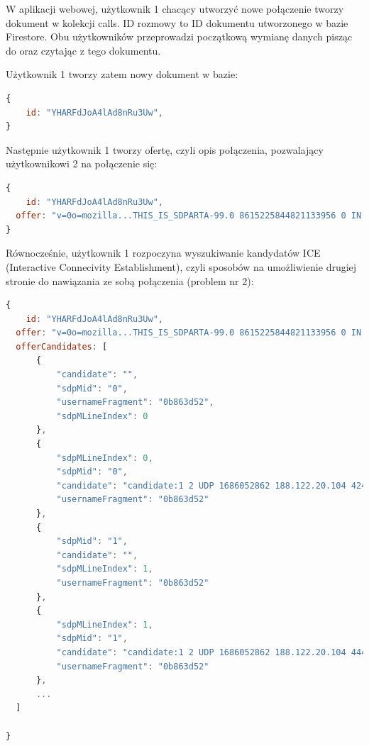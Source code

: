 W aplikacji webowej, użytkownik 1 chacący utworzyć nowe połączenie tworzy dokument w kolekcji calls. ID rozmowy to ID
dokumentu utworzonego w bazie Firestore. Obu użytkowników przeprowadzi początkową wymianę danych pisząc do oraz czytając
z tego dokumentu.

Użytkownik 1 tworzy zatem nowy dokument w bazie:

\begin{lstlisting}[language=Javascript,label=list:call-doc-1, caption=Dokument połączenia po utworzeniu przez użytkownika 1,
basicstyle=\footnotesize \ttfamily, showtabs=true, tabsize=4]
{
	id: "YHARFdJoA4lAd8nRu3Uw",
}
\end{lstlisting}

Następnie użytkownik 1 tworzy ofertę, czyli opis połączenia, pozwalający użytkownikowi 2 na połączenie się:

\begin{lstlisting}[language=Javascript,label=list:call-doc-2, caption=Dokument połączenia po dodaniu opisu sesji w protokole SDP,
basicstyle=\footnotesize \ttfamily, showtabs=true, tabsize=4]
{
	id: "YHARFdJoA4lAd8nRu3Uw",
  offer: "v=0o=mozilla...THIS_IS_SDPARTA-99.0 8615225844821133956 0 IN IP4 0.0.0.0s=-t=0 0a=fingerprint:sha-256 5F:A8:8A:A5:B8:1D:0C:39:21:93:FA:3A:B2:B7:B6:3F:EF:8A:5D:3C:6E:86:2E:A7:0A:D4:F0:E3:58:E0:E2:7B..."
}
\end{lstlisting}

Równocześnie, użytkownik 1 rozpoczyna wyszukiwanie kandydatów ICE (Interactive Connecivity Establishment), czyli
sposobów na umożliwienie drugiej stronie do nawiązania ze sobą połączenia (problem nr 2):

\begin{lstlisting}[language=Javascript,label=list:call-doc-3, caption=Dokument połączenia po dodaniu kandydatów ICE,
basicstyle=\footnotesize \ttfamily, showtabs=true, tabsize=4]
{
	id: "YHARFdJoA4lAd8nRu3Uw",
  offer: "v=0o=mozilla...THIS_IS_SDPARTA-99.0 8615225844821133956 0 IN IP4 0.0.0.0s=-t=0 0a=fingerprint:sha-256 5F:A8:8A:A5:B8:1D:0C:39:21:93:FA:3A:B2:B7:B6:3F:EF:8A:5D:3C:6E:86:2E:A7:0A:D4:F0:E3:58:E0:E2:7B...",
  offerCandidates: [
      {
          "candidate": "",
          "sdpMid": "0",
          "usernameFragment": "0b863d52",
          "sdpMLineIndex": 0
      },
      {
          "sdpMLineIndex": 0,
          "sdpMid": "0",
          "candidate": "candidate:1 2 UDP 1686052862 188.122.20.104 42436 typ srflx raddr 192.168.1.2 rport 42436",
          "usernameFragment": "0b863d52"
      },
      {
          "sdpMid": "1",
          "candidate": "",
          "sdpMLineIndex": 1,
          "usernameFragment": "0b863d52"
      },
      {
          "sdpMLineIndex": 1,
          "sdpMid": "1",
          "candidate": "candidate:1 2 UDP 1686052862 188.122.20.104 44466 typ srflx raddr 192.168.1.2 rport 44466",
          "usernameFragment": "0b863d52"
      },
      ...
  ]

}
\end{lstlisting}

